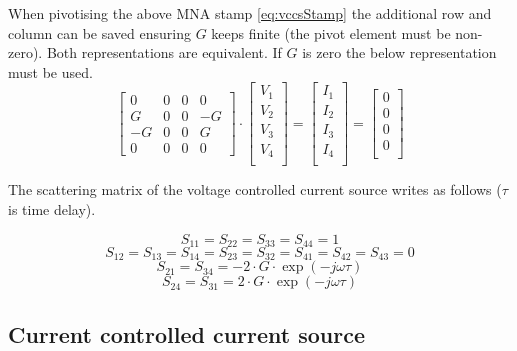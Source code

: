 When pivotising the above MNA stamp \eqref{eq:vccsStamp} the
additional row and column can be saved ensuring $G$ keeps finite (the
pivot element must be non-zero).  Both representations are equivalent.
If $G$ is zero the below representation must be used.
\begin{equation}
\begin{bmatrix}
0&0&0&0\\
G&0&0&-G\\
-G&0&0&G\\
0&0&0&0
\end{bmatrix}
\cdot
\begin{bmatrix}
V_{1}\\
V_{2}\\
V_{3}\\
V_{4}\\
\end{bmatrix}
=
\begin{bmatrix}
I_{1}\\
I_{2}\\
I_{3}\\
I_{4}\\
\end{bmatrix}
=
\begin{bmatrix}
0\\
0\\
0\\
0\\
\end{bmatrix}
\end{equation}

The scattering matrix of the voltage controlled current source
writes as follows ($\tau$ is time delay).

\begin{equation}
S_{11} = S_{22} = S_{33} = S_{44} = 1
\end{equation}
\begin{equation}
S_{12} = S_{13} = S_{14} = S_{23} = S_{32} = S_{41} = S_{42} = S_{43} = 0
\end{equation}
\begin{equation}
S_{21} = S_{34} = -2\cdot G\cdot \exp\left(-j\omega\tau\right)
\end{equation}
\begin{equation}
S_{24} = S_{31} = 2\cdot G\cdot \exp\left(-j\omega\tau\right)
\end{equation}


\subsection{Current controlled current source}
\label{sec:cccs}

